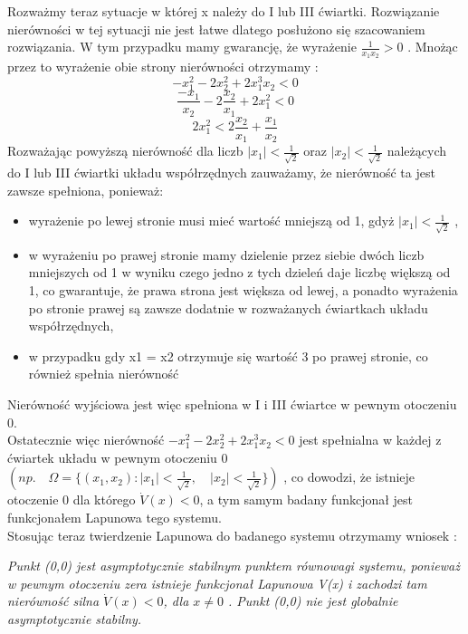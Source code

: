 \documentclass[a4paper,11pt]{article}
\begin{document}
Rozważmy teraz sytuacje w której x należy do I lub III ćwiartki. Rozwiązanie nierówności w tej sytuacji nie jest łatwe dlatego posłużono się szacowaniem rozwiązania. W tym przypadku mamy gwarancję, że wyrażenie \( \frac{1}{x_{1}x_{2}} > 0 \) . Mnożąc przez to wyrażenie obie strony nierówności otrzymamy : 
\begin{equation*}
-x_{1}^{2}-2x_{2}^{2}+2x_{1}^{3} x_{2} < 0 
\end{equation*} 
\begin{equation*}
\frac{-x_{1}}{x_{2}}-2\frac{x_{2}}{x_{1}}+2x_{1}^{2} < 0
\end{equation*}
\begin{equation*}
2x_{1}^{2} < 2\frac{x_{2}}{x_{1}}+\frac{x_{1}}{x_{2}}
\end{equation*}
Rozważając powyższą nierówność dla liczb \(|x_{1}|<\frac{1}{\sqrt{2}}\) oraz \(|x_{2}|<\frac{1}{\sqrt{2}}\) należących do I lub III ćwiartki układu współrzędnych zauważamy, że nierówność ta jest zawsze spełniona, ponieważ:
\begin{itemize}
\item wyrażenie po lewej stronie musi mieć wartość mniejszą od 1, gdyż \(|x_{1}|<\frac{1}{\sqrt{2}}\) , 
\item w wyrażeniu po prawej stronie mamy dzielenie przez siebie dwóch liczb mniejszych od 1 w wyniku czego jedno z tych dzieleń daje liczbę większą od 1, co gwarantuje, że prawa strona jest większa od lewej, a ponadto wyrażenia po stronie prawej są zawsze dodatnie w rozważanych ćwiartkach układu współrzędnych,
\item w przypadku gdy x1 = x2 otrzymuje się wartość 3 po prawej stronie, co również spełnia nierówność
\end{itemize}
Nierówność wyjściowa jest więc spełniona w I i III ćwiartce w pewnym otoczeniu 0. \\
Ostatecznie więc nierówność \( -x_{1}^{2}-2x_{2}^{2}+2x_{1}^{3} x_{2} < 0 \) jest spełnialna w każdej z ćwiartek układu w pewnym otoczeniu 0 \( \left( np.  \quad \Omega = \{ (x_{1},x_{2} ) : |x_{1}| < \frac{1}{\sqrt{2}}, \quad |x_{2}| < \frac{1}{\sqrt{2}} \} \right) \) , co dowodzi, że istnieje otoczenie 0 dla którego \( \dot{V}(x) < 0 \), a tym samym badany funkcjonał jest funkcjonałem Lapunowa tego systemu.\\ 
Stosując teraz twierdzenie Lapunowa do badanego systemu otrzymamy wniosek : 
\begin{center}
\textit{Punkt (0,0) jest asymptotycznie stabilnym punktem równowagi systemu, ponieważ w pewnym otoczeniu zera istnieje funkcjonał Lapunowa V(x) i zachodzi tam nierówność silna \( \dot{V}(x)<0\), dla \( x \neq 0 \) . Punkt (0,0) nie jest globalnie asymptotycznie stabilny.} 
\end{center}
\end{document}
